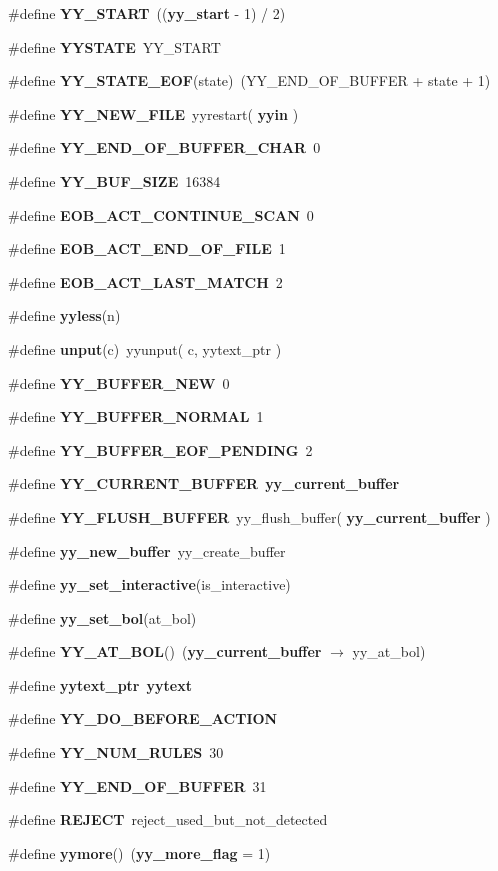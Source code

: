 \begin{CompactItemize}
\item 
\#define {\bf YY\_\-START}\ (({\bf yy\_\-start} - 1) / 2)
\item 
\#define {\bf YYSTATE}\ YY\_\-START
\item 
\#define {\bf YY\_\-STATE\_\-EOF}(state)\ (YY\_\-END\_\-OF\_\-BUFFER + state + 1)
\item 
\#define {\bf YY\_\-NEW\_\-FILE}\ yyrestart( {\bf yyin} )
\item 
\#define {\bf YY\_\-END\_\-OF\_\-BUFFER\_\-CHAR}\ 0
\item 
\#define {\bf YY\_\-BUF\_\-SIZE}\ 16384
\item 
\#define {\bf EOB\_\-ACT\_\-CONTINUE\_\-SCAN}\ 0
\item 
\#define {\bf EOB\_\-ACT\_\-END\_\-OF\_\-FILE}\ 1
\item 
\#define {\bf EOB\_\-ACT\_\-LAST\_\-MATCH}\ 2
\item 
\#define {\bf yyless}(n)
\item 
\#define {\bf unput}(c)\ yyunput( c, yytext\_\-ptr )
\item 
\#define {\bf YY\_\-BUFFER\_\-NEW}\ 0
\item 
\#define {\bf YY\_\-BUFFER\_\-NORMAL}\ 1
\item 
\#define {\bf YY\_\-BUFFER\_\-EOF\_\-PENDING}\ 2
\item 
\#define {\bf YY\_\-CURRENT\_\-BUFFER}\ {\bf yy\_\-current\_\-buffer}
\item 
\#define {\bf YY\_\-FLUSH\_\-BUFFER}\ yy\_\-flush\_\-buffer( {\bf yy\_\-current\_\-buffer} )
\item 
\#define {\bf yy\_\-new\_\-buffer}\ yy\_\-create\_\-buffer
\item 
\#define {\bf yy\_\-set\_\-interactive}(is\_\-interactive)
\item 
\#define {\bf yy\_\-set\_\-bol}(at\_\-bol)
\item 
\#define {\bf YY\_\-AT\_\-BOL}()\ ({\bf yy\_\-current\_\-buffer} $\rightarrow$ yy\_\-at\_\-bol)
\item 
\#define {\bf yytext\_\-ptr}\ {\bf yytext}
\item 
\#define {\bf YY\_\-DO\_\-BEFORE\_\-ACTION}
\item 
\#define {\bf YY\_\-NUM\_\-RULES}\ 30
\item 
\#define {\bf YY\_\-END\_\-OF\_\-BUFFER}\ 31
\item 
\#define {\bf REJECT}\ reject\_\-used\_\-but\_\-not\_\-detected
\item 
\#define {\bf yymore}()\ ({\bf yy\_\-more\_\-flag} = 1)

\end{CompactItemize}
